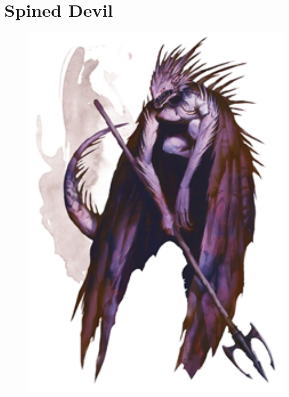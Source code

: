\documentclass[oneside]{clgrammar}
\begin{document}
\newpage

\section{Spined Devil}
\begin{figure}[h!]
\centering
\includegraphics[width=350pt]{images/monstros/spined_devil-removebg-preview.png}
\end{figure}

\newpage
\end{document}
